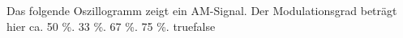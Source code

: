     {Das folgende Oszillogramm zeigt ein AM-Signal. Der Modulationsgrad beträgt hier ca.}
    {50 \%.}
    {33 \%.}
    {67 \%.}
    {75 \%.}
    {true}{false}